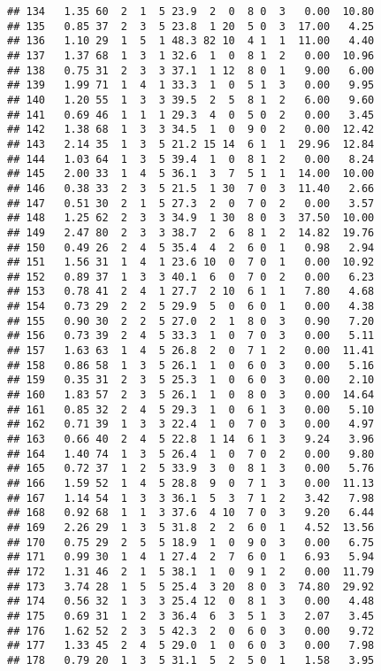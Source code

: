 \documentclass[
]{article}
\begin{document}
\begin{verbatim}
## 134   1.35 60  2  1  5 23.9  2  0  8 0  3   0.00  10.80
## 135   0.85 37  2  3  5 23.8  1 20  5 0  3  17.00   4.25
## 136   1.10 29  1  5  1 48.3 82 10  4 1  1  11.00   4.40
## 137   1.37 68  1  3  1 32.6  1  0  8 1  2   0.00  10.96
## 138   0.75 31  2  3  3 37.1  1 12  8 0  1   9.00   6.00
## 139   1.99 71  1  4  1 33.3  1  0  5 1  3   0.00   9.95
## 140   1.20 55  1  3  3 39.5  2  5  8 1  2   6.00   9.60
## 141   0.69 46  1  1  1 29.3  4  0  5 0  2   0.00   3.45
## 142   1.38 68  1  3  3 34.5  1  0  9 0  2   0.00  12.42
## 143   2.14 35  1  3  5 21.2 15 14  6 1  1  29.96  12.84
## 144   1.03 64  1  3  5 39.4  1  0  8 1  2   0.00   8.24
## 145   2.00 33  1  4  5 36.1  3  7  5 1  1  14.00  10.00
## 146   0.38 33  2  3  5 21.5  1 30  7 0  3  11.40   2.66
## 147   0.51 30  2  1  5 27.3  2  0  7 0  2   0.00   3.57
## 148   1.25 62  2  3  3 34.9  1 30  8 0  3  37.50  10.00
## 149   2.47 80  2  3  3 38.7  2  6  8 1  2  14.82  19.76
## 150   0.49 26  2  4  5 35.4  4  2  6 0  1   0.98   2.94
## 151   1.56 31  1  4  1 23.6 10  0  7 0  1   0.00  10.92
## 152   0.89 37  1  3  3 40.1  6  0  7 0  2   0.00   6.23
## 153   0.78 41  2  4  1 27.7  2 10  6 1  1   7.80   4.68
## 154   0.73 29  2  2  5 29.9  5  0  6 0  1   0.00   4.38
## 155   0.90 30  2  2  5 27.0  2  1  8 0  3   0.90   7.20
## 156   0.73 39  2  4  5 33.3  1  0  7 0  3   0.00   5.11
## 157   1.63 63  1  4  5 26.8  2  0  7 1  2   0.00  11.41
## 158   0.86 58  1  3  5 26.1  1  0  6 0  3   0.00   5.16
## 159   0.35 31  2  3  5 25.3  1  0  6 0  3   0.00   2.10
## 160   1.83 57  2  3  5 26.1  1  0  8 0  3   0.00  14.64
## 161   0.85 32  2  4  5 29.3  1  0  6 1  3   0.00   5.10
## 162   0.71 39  1  3  3 22.4  1  0  7 0  3   0.00   4.97
## 163   0.66 40  2  4  5 22.8  1 14  6 1  3   9.24   3.96
## 164   1.40 74  1  3  5 26.4  1  0  7 0  2   0.00   9.80
## 165   0.72 37  1  2  5 33.9  3  0  8 1  3   0.00   5.76
## 166   1.59 52  1  4  5 28.8  9  0  7 1  3   0.00  11.13
## 167   1.14 54  1  3  3 36.1  5  3  7 1  2   3.42   7.98
## 168   0.92 68  1  1  3 37.6  4 10  7 0  3   9.20   6.44
## 169   2.26 29  1  3  5 31.8  2  2  6 0  1   4.52  13.56
## 170   0.75 29  2  5  5 18.9  1  0  9 0  3   0.00   6.75
## 171   0.99 30  1  4  1 27.4  2  7  6 0  1   6.93   5.94
## 172   1.31 46  2  1  5 38.1  1  0  9 1  2   0.00  11.79
## 173   3.74 28  1  5  5 25.4  3 20  8 0  3  74.80  29.92
## 174   0.56 32  1  3  3 25.4 12  0  8 1  3   0.00   4.48
## 175   0.69 31  1  2  3 36.4  6  3  5 1  3   2.07   3.45
## 176   1.62 52  2  3  5 42.3  2  0  6 0  3   0.00   9.72
## 177   1.33 45  2  4  5 29.0  1  0  6 0  3   0.00   7.98
## 178   0.79 20  1  3  5 31.1  5  2  5 0  1   1.58   3.95

\end{verbatim}
\end{document}
